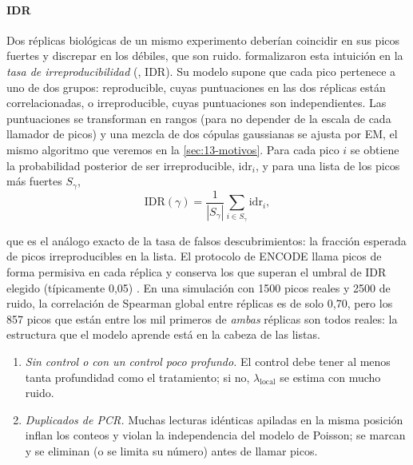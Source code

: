 \paragraph{IDR} Dos réplicas biológicas de un mismo experimento deberían coincidir en sus picos fuertes y discrepar en los débiles, que son ruido. \textcite{c13-li2011} formalizaron esta intuición en la \emph{tasa de irreproducibilidad} (, IDR). Su modelo supone que cada pico pertenece a uno de dos grupos: reproducible, cuyas puntuaciones en las dos réplicas están correlacionadas, o irreproducible, cuyas puntuaciones son independientes. Las puntuaciones se transforman en rangos (para no depender de la escala de cada llamador de picos) y una mezcla de dos cópulas gaussianas se ajusta por EM, el mismo algoritmo que veremos en la \cref{sec:13-motivos}. Para cada pico $i$ se obtiene la probabilidad posterior de ser irreproducible, $\mathrm{idr}_i$, y para una lista de los picos más fuertes $S_\gamma$,
\begin{equation}\label{eq:13-idr}
\mathrm{IDR}(\gamma) = \frac{1}{|S_\gamma|}\sum_{i\in S_\gamma}\mathrm{idr}_i ,
\end{equation}
\begin{simbolos}
\end{simbolos}
\noindent que es el análogo exacto de la tasa de falsos descubrimientos: la fracción esperada de picos irreproducibles en la lista. El protocolo de ENCODE llama picos de forma permisiva en cada réplica y conserva los que superan el umbral de IDR elegido (típicamente 0,05) \parencite{c13-landt2012}. En una simulación con \num{1500} picos reales y \num{2500} de ruido, la correlación de Spearman global entre réplicas es de solo 0,70, pero los 857 picos que están entre los mil primeros de \emph{ambas} réplicas son todos reales: la estructura que el modelo aprende está en la cabeza de las listas.


\begin{cuidado}
\begin{enumerate}
  \item \emph{Sin control o con un control poco profundo.} El control debe tener al menos tanta profundidad como el tratamiento; si no, $\lambda_{\text{local}}$ se estima con mucho ruido.
  \item \emph{Duplicados de PCR.} Muchas lecturas idénticas apiladas en la misma posición inflan los conteos y violan la independencia del modelo de Poisson; se marcan y se eliminan (o se limita su número) antes de llamar picos.
\end{enumerate}
\end{cuidado}

